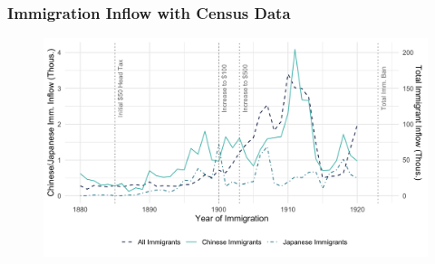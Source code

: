 \documentclass[pdf]{beamer}
\begin{document}

\begin{frame}[label = census_flow]
	\frametitle{Immigration Inflow with Census Data}
    \centering
	\begin{figure}[H]
		\begin{center}
			\includegraphics[width=\textwidth]{../../figs/21jul23/fig2_flow_jap.png}
		\end{center}
	\end{figure}
    \hyperlink{tab2_flow}{}
\end{frame}


\end{document}
